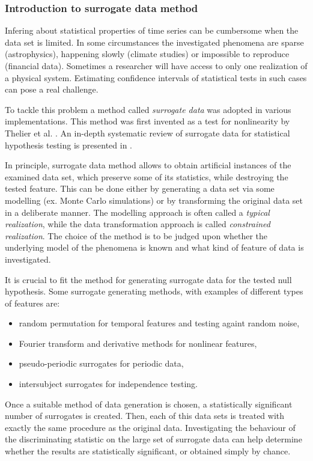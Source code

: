 \subsubsection{Introduction to surrogate data method}
Infering about statistical properties of time series can be cumbersome when the data set is limited.
In some circumstances the investigated phenomena are sparse (astrophysics), happening slowly (climate studies) or impossible to reproduce (financial data).
Sometimes a researcher will have access to only one realization of a physical system.
Estimating confidence intervals of statistical tests in such cases can pose a real challenge.

To tackle this problem a method called \emph{surrogate data} was adopted in various implementations.
This method was first invented as a test for nonlinearity by Thelier et al. \cite{1992-thelier}.
An in-depth systematic review of surrogate data for statistical hypothesis testing is presented in \cite{2018-lancaster}.

In principle, surrogate data method allows to obtain artificial instances of the examined data set, which preserve some of its statistics, while destroying the tested feature.
This can be done either by generating a data set via some modelling (ex. Monte Carlo simulations) or by transforming the original data set in a deliberate manner.
The modelling approach is often called a \emph{typical realization}, while the data transformation approach is called \emph{constrained realization}.
The choice of the method is to be judged upon whether the underlying model of the phenomena is known and what kind of feature of data is investigated. 

It is crucial to fit the method for generating surrogate data for the tested null hypothesis.
Some surrogate generating methods, with examples of different types of features are:
\begin{itemize}
    \item random permutation for temporal features and testing againt random noise,
    \item Fourier transform and derivative methods for nonlinear features,
    \item pseudo-periodic surrogates for periodic data,
    \item intersubject surrogates for independence testing.
\end{itemize}

Once a suitable method of data generation is chosen, a statistically significant number of surrogates is created.
Then, each of this data sets is treated with exactly the same procedure as the original data.
Investigating the behaviour of the discriminating statistic on the large set of surrogate data can help determine whether the results are statistically significant, or obtained simply by chance.

